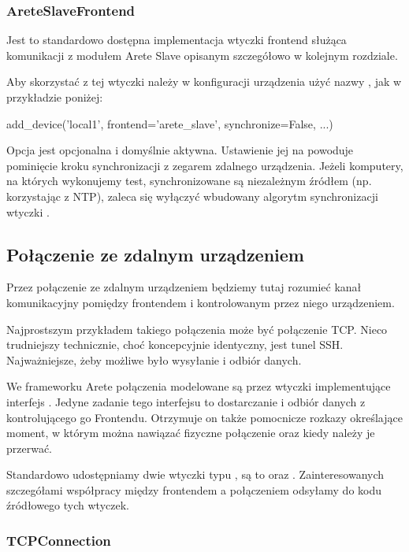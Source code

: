 \documentclass[00-praca-magisterska.tex]{subfiles}
\begin{document}
\subsubsection{AreteSlaveFrontend}

Jest to standardowo dostępna implementacja wtyczki frontend służąca komunikacji
z modułem Arete Slave opisanym szczegółowo w kolejnym rozdziale.

Aby skorzystać z tej wtyczki należy w konfiguracji urządzenia użyć nazwy
, jak w przykładzie poniżej:

\begin{pythoncode}
  add_device('local1',
    frontend='arete_slave',
    synchronize=False,
    ...)
\end{pythoncode}

Opcja  jest opcjonalna i domyślnie aktywna. Ustawienie jej na
 powoduje pominięcie kroku synchronizacji z zegarem zdalnego
urządzenia. Jeżeli komputery, na których wykonujemy test, synchronizowane są
niezależnym źródłem (np. korzystając z NTP), zaleca się wyłączyć wbudowany
algorytm synchronizacji wtyczki .

\subsection{Połączenie ze zdalnym urządzeniem}

Przez połączenie ze zdalnym urządzeniem będziemy tutaj rozumieć kanał
komunikacyjny pomiędzy frontendem i kontrolowanym przez niego urządzeniem.

Najprostszym przykładem takiego połączenia może być połączenie TCP. Nieco
trudniejszy technicznie, choć koncepcyjnie identyczny, jest tunel SSH.
Najważniejsze, żeby możliwe było wysyłanie i odbiór danych.

We frameworku Arete połączenia modelowane są przez wtyczki implementujące
interfejs . Jedyne zadanie tego interfejsu to
dostarczanie i odbiór danych z kontrolującego go Frontendu. Otrzymuje on także
pomocnicze rozkazy określające moment, w którym można nawiązać fizyczne
połączenie oraz kiedy należy je przerwać.

Standardowo udostępniamy dwie wtyczki typu , są to
 oraz . Zainteresowanych szczegółami
współpracy między frontendem a połączeniem odsyłamy do kodu źródłowego tych
wtyczek.

\subsubsection{TCPConnection}
\end{document}
